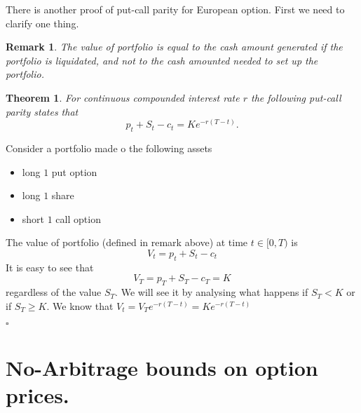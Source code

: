 \documentclass{book}
\newtheorem{theorem}{Theorem}[section]
\newtheorem{remark}{Remark}[section]
\newenvironment{proof}
{{\bf Proof. }}{\begin{flushright}$\square$\end{flushright}}
\begin{document}
There is another proof of put-call parity for European option. First we need to clarify one thing.
\begin{remark}
The value of portfolio is equal to the cash amount generated if the portfolio is liquidated, and not to the cash amounted needed to set up the portfolio.
\end{remark}
\begin{theorem}
For continuous compounded interest rate $r$ the following put-call parity states that
$$
p_{t}+S_{t}-c_{t}=Ke^{-r(T-t)}.
$$
\end{theorem} 
\begin{proof}
Consider a portfolio made o the following assets
\begin{itemize}
\item long $1$ put option
\item long $1$ share
\item short $1$ call option
\end{itemize}
The value of portfolio (defined in remark above) at time $t\in[0,T)$ is
$$
V_{t}=p_{t}+S_{t}-c_{t}
$$
It is easy to see that 
$$
V_{T}=p_{T}+S_{T}-c_{T}=K
$$
regardless of the value $S_{T}$. We will see it by analysing what happens if $S_{T}<K$ or if $S_{T}\geq K$. We know that $V_{t}=V_{T}e^{-r(T-t)}=Ke^{-r(T-t)}$
\end{proof}
\section{No-Arbitrage bounds on option prices.}
\end{document}
